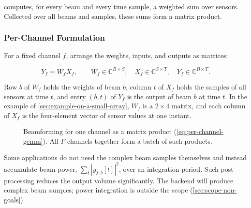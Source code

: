  computes, for every beam and every time sample, a weighted sum over sensors. Collected over all beams and samples, these sums form a matrix product.

\subsubsection{Per-Channel Formulation}
\label{sec:per-channel-formulation}

For a fixed channel $f$, arrange the weights, inputs, and outputs as matrices:

\begin{equation}
  Y_f = W_f X_f,
  \qquad
  W_f \in \mathbb{C}^{B \times S},
  \quad
  X_f \in \mathbb{C}^{S \times T},
  \quad
  Y_f \in \mathbb{C}^{B \times T}.
  \label{eq:per-channel-gemm}
\end{equation}

Row $b$ of $W_f$ holds the weights of beam $b$, column $t$ of $X_f$ holds the samples of all sensors at time $t$, and entry $(b,t)$ of $Y_f$ is the output of beam $b$ at time $t$. In the example of \cref{sec:example-on-a-small-array}, $W_f$ is a $2 \times 4$ matrix, and each column of $X_f$ is the four-element vector of sensor values at one instant.

\begin{figure}[H]
  \centering
  \caption{Beamforming for one channel as a matrix product (\cref{eq:per-channel-gemm}). All $F$ channels together form a batch of such products.}
  \label{fig:per-channel-gemm}
\end{figure}

Some applications do not need the complex beam samples themselves and instead accumulate beam power, $\sum_t |y_{f,b}[t]|^2$, over an integration period. Such post-processing reduces the output volume significantly. The backend will produce complex beam samples; power integration is outside the scope (\cref{sec:scope-non-goals}).

